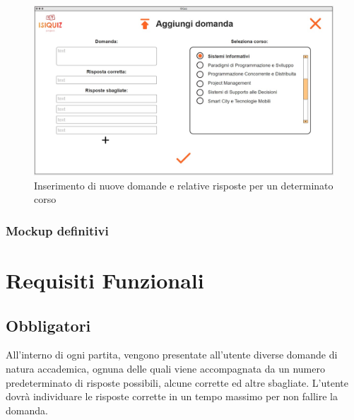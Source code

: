         \begin{figure}[H]
            \centering
            \includegraphics[width=\textwidth]{Images/mockup/import2.jpg}
            \caption{Inserimento di nuove domande e relative risposte per un determinato corso}
            \label{fig:Import2}
        \end{figure}
        
        \subsubsection{Mockup definitivi}\label{mockupFinished}
	    
	\section{Requisiti Funzionali} 
        \subsection{Obbligatori}
        All’interno di ogni partita, vengono presentate all’utente diverse domande di natura accademica, ognuna delle quali viene accompagnata da un numero predeterminato di risposte possibili, alcune corrette ed altre sbagliate. L’utente dovrà individuare le risposte corrette in un tempo massimo per non fallire la domanda. 

